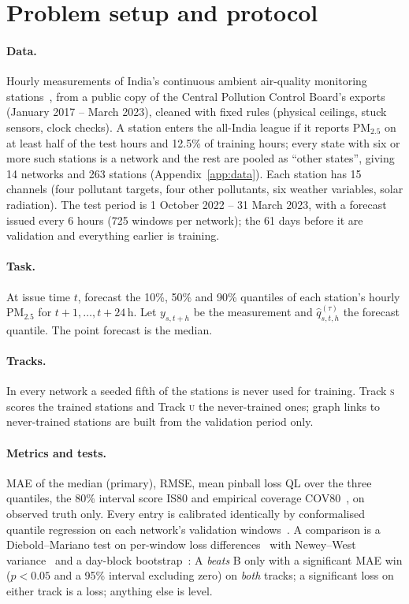 \documentclass{article}
\newcommand{\pmtf}{PM$_{2.5}$}
\newcommand{\trk}[1]{\textsc{#1}}
\begin{document}
\section{Problem setup and protocol}
\label{sec:setup}

\paragraph{Data.} Hourly measurements of India's continuous ambient air-quality monitoring stations~\citep{cpcb}, from
a public copy of the Central Pollution Control Board's exports~\citep{kaggleaq} (January 2017 -- March 2023), cleaned
with fixed rules (physical ceilings, stuck sensors, clock checks). A station enters the all-India league if it reports
\pmtf{} on at least half of the test hours and 12.5\% of training hours; every state with six or more such stations is a
network and the rest are pooled as ``other states'', giving 14 networks and 263 stations
(Appendix~\ref{app:data}). Each station has 15 channels (four pollutant targets, four other pollutants, six weather
variables, solar radiation). The test period is 1 October 2022 -- 31 March 2023, with a forecast issued every 6 hours
(725 windows per network); the 61 days before it are validation and everything earlier is training.

\paragraph{Task.} At issue time $t$, forecast the 10\%, 50\% and 90\% quantiles of each station's hourly \pmtf{} for
$t{+}1,\dots,t{+}24$\,h. Let $y_{s,t+h}$ be the measurement and $\hat q^{(\tau)}_{s,t,h}$ the forecast quantile. The
point forecast is the median.

\paragraph{Tracks.} In every network a seeded fifth of the stations is never used for training. Track \trk{s} scores
the trained stations and Track \trk{u} the never-trained ones; graph links to never-trained stations are built from the
validation period only.

\paragraph{Metrics and tests.} MAE of the median (primary), RMSE, mean pinball loss QL over the three quantiles, the
80\% interval score IS80 and empirical coverage COV80~\citep{gneiting2007scoring}, on observed truth only. Every entry
is calibrated identically by conformalised quantile regression on each network's validation
windows~\citep{romano2019cqr}. A comparison is a Diebold--Mariano test on per-window loss
differences~\citep{diebold1995dm} with Newey--West variance~\citep{newey1987hac} and a day-block
bootstrap~\citep{kunsch1989bootstrap}: A \emph{beats} B only with a significant MAE win ($p<0.05$ and a 95\% interval
excluding zero) on \emph{both} tracks; a significant loss on either track is a loss; anything else is level.
\end{document}
